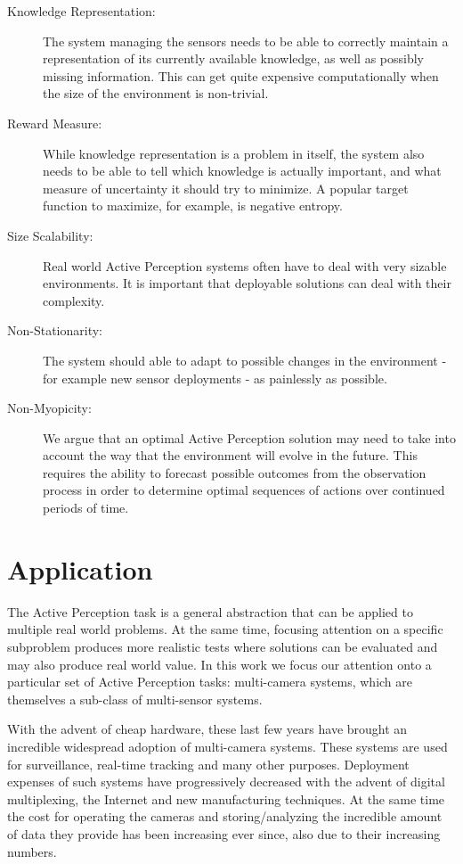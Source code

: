 \begin{description}
\item[Knowledge Representation:] The system managing the sensors needs to be able to correctly
    maintain a representation of its currently available knowledge, as well as possibly missing
    information. This can get quite expensive computationally when the size of the environment is
    non-trivial.
\item[Reward Measure:] While knowledge representation is a problem in itself, the system also needs
    to be able to tell which knowledge is actually important, and what measure of uncertainty it
    should try to minimize. A popular target function to maximize, for example, is negative entropy.
\item[Size Scalability:] Real world Active Perception systems often have to deal with very
sizable environments. It is important that deployable solutions can deal with their complexity.
\item[Non-Stationarity:] The system should able to adapt to possible changes in the environment -
for example new sensor deployments - as painlessly as possible.
\item[Non-Myopicity:] We argue that an optimal Active Perception solution may need to take into
    account the way that the environment will evolve in the future. This requires the ability to
    forecast possible outcomes from the observation process in order to determine optimal sequences
    of actions over continued periods of time.
\end{description}

\section{Application}

The Active Perception task is a general abstraction that can be applied to multiple real world
problems. At the same time, focusing attention on a specific subproblem produces more realistic
tests where solutions can be evaluated and may also produce real world value. In this work we focus
our attention onto a particular set of Active Perception tasks: multi-camera systems, which are
themselves a sub-class of multi-sensor systems.

With the advent of cheap hardware, these last few years have brought an incredible widespread
adoption of multi-camera systems. These systems are used for surveillance, real-time tracking and
many other purposes. Deployment expenses of such systems have progressively decreased with the
advent of digital multiplexing, the Internet and new manufacturing techniques. At the same time the
cost for operating the cameras and storing/analyzing the incredible amount of data they provide has
been increasing ever since, also due to their increasing numbers.

